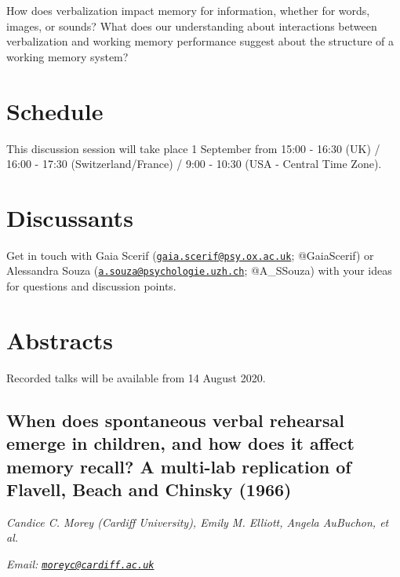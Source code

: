 \documentclass[
  12pt,
]{book}
\begin{document}
How does verbalization impact memory for information, whether for words, images, or sounds? What does our understanding about interactions between verbalization and working memory performance suggest about the structure of a working memory system?

\hypertarget{schedule-1}{%
\section{Schedule}\label{schedule-1}}

This discussion session will take place 1 September from 15:00 - 16:30 (UK) / 16:00 - 17:30 (Switzerland/France) / 9:00 - 10:30 (USA - Central Time Zone).

\hypertarget{discussants-1}{%
\section{Discussants}\label{discussants-1}}

Get in touch with Gaia Scerif (\href{mailto:gaia.scerif@psy.ox.ac.uk}{\nolinkurl{gaia.scerif@psy.ox.ac.uk}}; @GaiaScerif) or Alessandra Souza (\href{mailto:a.souza@psychologie.uzh.ch}{\nolinkurl{a.souza@psychologie.uzh.ch}}; @A\_SSouza) with your ideas for questions and discussion points.

\hypertarget{abstracts-1}{%
\section{Abstracts}\label{abstracts-1}}

Recorded talks will be available from 14 August 2020.

\hypertarget{when-does-spontaneous-verbal-rehearsal-emerge-in-children-and-how-does-it-affect-memory-recall-a-multi-lab-replication-of-flavell-beach-and-chinsky-1966}{%
\subsection{When does spontaneous verbal rehearsal emerge in children, and how does it affect memory recall? A multi-lab replication of Flavell, Beach and Chinsky (1966)}\label{when-does-spontaneous-verbal-rehearsal-emerge-in-children-and-how-does-it-affect-memory-recall-a-multi-lab-replication-of-flavell-beach-and-chinsky-1966}}

\emph{Candice C. Morey (Cardiff University), Emily M. Elliott, Angela AuBuchon, et al.}

\emph{Email: \href{mailto:moreyc@cardiff.ac.uk}{\nolinkurl{moreyc@cardiff.ac.uk}}}
\end{document}
